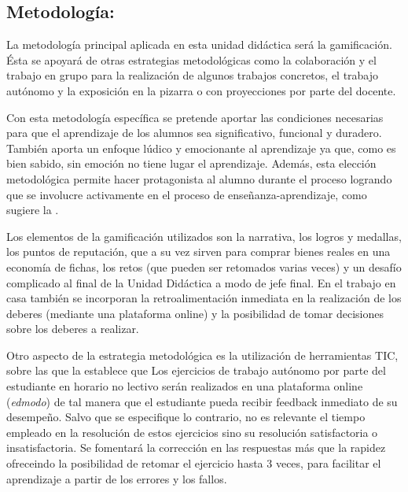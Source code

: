 \subsection{Metodología:}

La metodología principal aplicada en esta unidad didáctica será la gamificación.
%
Ésta se apoyará de otras estrategias metodológicas como la colaboración y el trabajo en grupo para la realización de algunos trabajos concretos, el trabajo autónomo y la exposición en la pizarra o con proyecciones por parte del docente.

Con esta metodología específica se pretende aportar las condiciones necesarias para que el aprendizaje de los alumnos sea significativo, funcional y duradero.
%
También aporta un enfoque lúdico y emocionante al aprendizaje ya que, como es bien sabido, sin emoción no tiene lugar el aprendizaje.
%
Además, esta elección metodológica permite hacer protagonista al alumno durante el proceso logrando que se involucre activamente en el proceso de enseñanza-aprendizaje, como sugiere la \lomce.
%


Los elementos de la gamificación utilizados son la narrativa, los logros y medallas, los puntos de reputación, que a su vez sirven para comprar bienes reales en una economía de fichas, los retos (que pueden ser retomados varias veces) y un desafío complicado al final de la Unidad Didáctica a modo de jefe final.
%
En el trabajo en casa también se incorporan la retroalimentación inmediata en la realización de los deberes (mediante una plataforma online) y la posibilidad de tomar decisiones sobre los deberes a realizar.

Otro aspecto de la estrategia metodológica es la utilización de herramientas \gls{TIC}, sobre las que la \lomce establece que 
%
Los ejercicios de trabajo autónomo por parte del estudiante en horario no lectivo serán realizados en una plataforma online (\textit{edmodo}) de tal manera que el estudiante pueda recibir feedback inmediato de su desempeño.
%
Salvo que se especifique lo contrario, no es relevante el tiempo empleado en la resolución de estos ejercicios sino su resolución satisfactoria o insatisfactoria.
%
Se fomentará la corrección en las respuestas más que la rapidez ofreceindo la posibilidad de retomar el ejercicio hasta 3 veces, para facilitar el aprendizaje a partir de los errores y los fallos.

